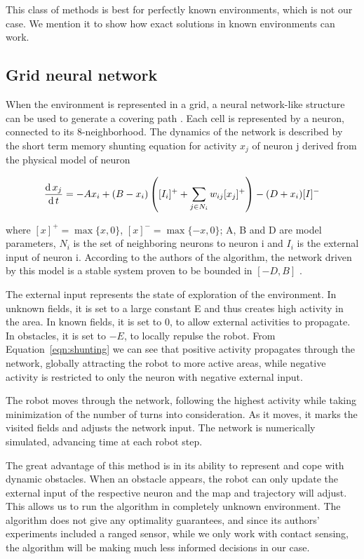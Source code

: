 \documentclass[buriama8_dp.tex]{subfiles}
\begin{document}
This class of methods is best for perfectly known environments, which is not our case. We mention it to show how exact solutions in known environments can work.


\subsection{Grid neural network}
\label{subsec:nncpp}
When the environment is represented in a grid, a neural network-like structure can be used to generate a covering path \cite{neural}. Each cell is represented by a neuron, connected to its 8-neighborhood. The dynamics of the network is described by the short term memory shunting equation for activity \(x_j\) of neuron \m j derived from the physical model of neuron \cite[sec.~III]{neural}
 
\begin{equation}
  \frac{\textrm{d}\, x_j}{\textrm{d}\, t} = -Ax_i + (B-x_i) \left( [I_i]^+ + \sum_{j \in N_i} w_{ij}[x_j]^+ \right) - (D+x_i)[I]^-
\label{eqn:shunting}
\end{equation}

\noindent where \([x]^+=\max\{x,0\}\), \([x]^-=\max\{-x,0\}\); \m A, \m B and \m D are model parameters, \(N_i\) is the set of neighboring neurons to neuron \m i and \(I_i\) is the external input of neuron \m i. According to the authors of the algorithm, the network driven by this model is a stable system proven to be bounded in \([-D,B]\) \cite{grossbergmodel}.

The external input represents the state of exploration of the environment. In unknown fields, it is set to a large constant \m E and thus creates high activity in the area. In known fields, it is set to 0, to allow external activities to propagate. In obstacles, it is set to \(-E\), to locally repulse the robot. From Equation~\ref{eqn:shunting} we can see that positive activity propagates through the network, globally attracting the robot to more active areas, while negative activity is restricted to only the neuron with negative external input.

The robot moves through the network, following the highest activity while taking minimization of the number of turns into consideration. As it moves, it marks the visited fields and adjusts the network input. The network is numerically simulated, advancing time at each robot step.

The great advantage of this method is in its ability to represent and cope with dynamic obstacles. When an obstacle appears, the robot can only update the external input of the respective neuron and the map and trajectory will adjust. This allows us to run the algorithm in completely unknown environment. The algorithm does not give any optimality guarantees, and since its authors' experiments included a ranged sensor, while we only work with contact sensing, the algorithm will be making much less informed decisions in our case.
\end{document}

